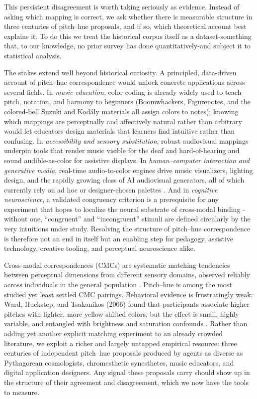 \documentclass[12pt]{article}
\begin{document}
This persistent disagreement is worth taking seriously as evidence.
Instead of asking which mapping is correct, we ask whether there is
measurable structure in three centuries of pitch--hue proposals, and if
so, which theoretical account best explains it. To do this we treat the
historical corpus itself as a dataset-something that, to our
knowledge, no prior survey has done quantitatively-and subject it to
statistical analysis.

The stakes extend well beyond historical curiosity. A principled,
data-driven account of pitch--hue correspondence would unlock concrete
applications across several fields. In \emph{music education}, color
coding is already widely used to teach pitch, notation, and harmony to
beginners (Boomwhackers, Figurenotes, and the colored-bell Suzuki and
Kod\'aly materials all assign colors to notes); knowing which mappings
are perceptually and affectively natural rather than arbitrary would
let educators design materials that learners find intuitive rather than
confusing. In \emph{accessibility and sensory substitution}, robust
audiovisual mappings underpin tools that render music visible for the
deaf and hard-of-hearing and sound audible-as-color for assistive
displays. In \emph{human--computer interaction and generative media},
real-time audio-to-color engines drive music visualizers, lighting
design, and the rapidly growing class of AI audiovisual generators,
all of which currently rely on ad hoc or designer-chosen palettes
\citep{baione2026}. And
in \emph{cognitive neuroscience}, a validated congruency criterion is a
prerequisite for any experiment that hopes to localize the neural
substrate of cross-modal binding - without one, ``congruent'' and
``incongruent'' stimuli are defined circularly by the very intuitions
under study. Resolving the structure of pitch--hue correspondence is
therefore not an end in itself but an enabling step for pedagogy,
assistive technology, creative tooling, and perceptual neuroscience
alike.

Cross-modal correspondences (CMCs) are systematic matching tendencies
between perceptual dimensions from different sensory domains, observed
reliably across individuals in the general population \citep{spence2011}.
Pitch--hue is among the most studied yet least settled CMC pairings.
Behavioral evidence is frustratingly weak: Ward, Huckstep, and
Tsakanikos (2006) found that participants associate higher pitches with
lighter, more yellow-shifted colors, but the effect is small, highly
variable, and entangled with brightness and saturation confounds
\citep{ward2006}. Rather than adding yet another explicit matching
experiment to an already crowded literature, we exploit a richer and
largely untapped empirical resource: three centuries of independent
pitch--hue proposals produced by agents as diverse as Pythagorean
cosmologists, chromesthetic synesthetes, music educators, and digital
application designers. Any signal these proposals carry should show up
in the structure of their agreement and disagreement, which we now have
the tools to measure.
\end{document}
